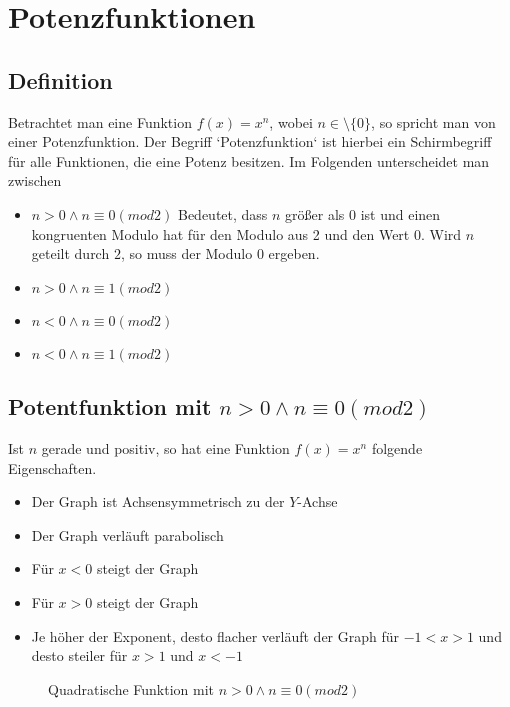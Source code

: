 \section{Potenzfunktionen}
\subsection{Definition}
Betrachtet man eine Funktion $f(x)=x^n$, wobei $n\in\setminus\{0\}$, so spricht man von einer Potenzfunktion. Der Begriff `{}Potenzfunktion`{} ist hierbei ein Schirmbegriff für alle Funktionen, die eine Potenz besitzen. Im Folgenden unterscheidet man zwischen
\begin{itemize}
	\item $n>0 \land n\equiv0(mod2)$ Bedeutet, dass $n$ größer als 0 ist und einen kongruenten Modulo hat für den Modulo aus 2 und den Wert $0$. Wird $n$ geteilt durch $2$, so muss der Modulo $0$ ergeben.
	\item $n>0\land n\equiv1(mod2)$
	\item $n<0\land n\equiv0(mod2)$
	\item $n<0\land n\equiv1(mod2)$
\end{itemize}
\subsection{Potentfunktion mit $n>0 \land n\equiv0(mod2)$}
Ist $n$ gerade und positiv, so hat eine Funktion $f(x)=x	^n$ folgende Eigenschaften.
\begin{itemize}
	\item Der Graph ist Achsensymmetrisch zu der $Y$-Achse
	\item Der Graph verläuft parabolisch
	\item Für $x<0$ steigt der Graph
	\item Für $x>0$ steigt der Graph
	\item Je höher der Exponent, desto flacher verläuft der Graph für $-1<x>1$ und desto steiler für $x>1$ und $x<-1$
\end{itemize}
\begin{figure}[h!]
\centering
{}
\caption{Quadratische Funktion mit $n>0 \land n\equiv0(mod2)$}
\label{f}
\end{figure}
